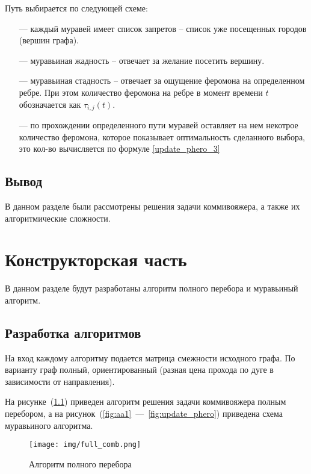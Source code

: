 \documentclass{bmstu}
\begin{document}
Путь выбирается по следующей схеме:

\begin{enumerate}
	\item [---] каждый муравей имеет список запретов -- список уже посещенных городов (вершин графа).
	\item [---] муравьиная жадность -- отвечает за желание посетить вершину.
	\item [---] муравьиная стадность -- отвечает за ощущение феромона на определенном ребре. При этом количество феромона на ребре в момент времени $t$ обозначается как $\tau_{i, j} (t)$.
	\item [---] по прохождении определенного пути муравей оставляет на нем некотрое количество феромона, которое показывает оптимальность сделанного выбора, это кол-во вычисляется по формуле \eqref{update_phero_3}
\end{enumerate}


\section*{Вывод}
В данном разделе были рассмотрены решения задачи коммивояжера, а также их алгоритмические сложности.

\chapter{Конструкторская часть}
В данном разделе будут разработаны алгоритм полного перебора и муравьиный алгоритм.

\section{Разработка алгоритмов}

На вход каждому алгоритму подается матрица смежности исходного графа. По варианту граф полный, ориентированный (разная цена прохода по дуге в зависимости от направления).

На рисунке~(\ref{fig:full_comb}) приведен алгоритм решения задачи коммивояжера полным перебором, а на рисунок~(\ref{fig:aa1}~---~\ref{fig:update_phero}) приведена схема муравьиного алгоритма.

\clearpage

\begin{figure}[h]
	\centering
 \vspace{0pt}
	\texttt{[image: img/full\_comb.png]}
	\caption{Алгоритм полного перебора}
	\label{fig:full_comb}
\end{figure}
\end{document}
